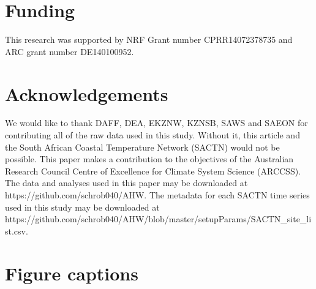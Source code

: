 \documentclass[utf8]{frontiersSCNS}
\begin{document}
\section*{Funding}
This research was supported by NRF Grant number CPRR14072378735 and ARC grant number DE140100952.


\section*{Acknowledgements}
We would like to thank DAFF, DEA, EKZNW, KZNSB, SAWS and SAEON for contributing all of the raw data used in this study. Without it, this article and the South African Coastal Temperature Network (SACTN) would not be possible. This paper makes a contribution to the objectives of the Australian Research Council Centre of Excellence for Climate System Science (ARCCSS). The data and analyses used in this paper may be downloaded at https://github.com/schrob040/AHW. The metadata for each SACTN time series used in this study may be downloaded at https://github.com/schrob040/AHW/blob/master/setupParams/SACTN\_site\_list.csv.






\section*{Figure captions}
\end{document}
